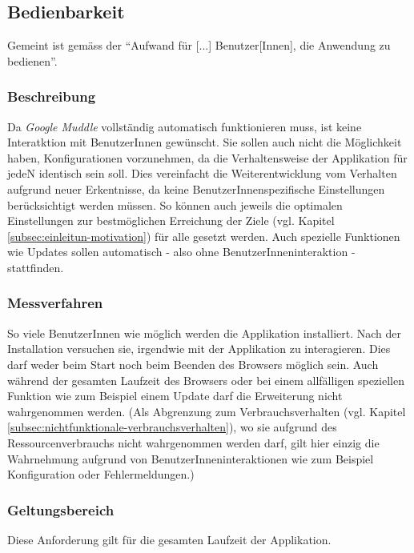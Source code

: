 \subsection{Bedienbarkeit}
\label{subsec:nichtfunktionale-bedienbarkeit}

Gemeint ist gemäss \cite{iso:9126} der \enquote{Aufwand für [...]
Benutzer[Innen], die Anwendung zu bedienen}.

\subsubsection{Beschreibung}

Da \textit{Google Muddle} vollständig automatisch funktionieren muss, ist keine
Interatktion mit BenutzerInnen gewünscht. Sie sollen auch nicht die Möglichkeit
haben, Konfigurationen vorzunehmen, da die Verhaltensweise der Applikation für
jedeN identisch sein soll. Dies vereinfacht die Weiterentwicklung vom Verhalten
aufgrund neuer Erkentnisse, da keine BenutzerInnenspezifische Einstellungen
berücksichtigt werden müssen. So können auch jeweils die optimalen Einstellungen
zur bestmöglichen Erreichung der Ziele (vgl. Kapitel
\ref{subsec:einleitun-motivation}) für alle gesetzt werden. Auch spezielle
Funktionen wie Updates sollen automatisch - also ohne BenutzerInneninteraktion
- stattfinden.

\subsubsection{Messverfahren}

So viele BenutzerInnen wie möglich werden die Applikation installiert. Nach der
Installation versuchen sie, irgendwie mit der Applikation zu interagieren. Dies
darf weder beim Start noch beim Beenden des Browsers möglich sein. Auch während
der gesamten Laufzeit des Browsers oder bei einem allfälligen speziellen
Funktion wie zum Beispiel einem Update darf die Erweiterung nicht wahrgenommen
werden. (Als Abgrenzung zum Verbrauchsverhalten (vgl. Kapitel 
\ref{subsec:nichtfunktionale-verbrauchsverhalten}), wo sie aufgrund des
Ressourcenverbrauchs nicht wahrgenommen werden darf, gilt hier einzig die
Wahrnehmung aufgrund von BenutzerInneninteraktionen wie zum Beispiel
Konfiguration oder Fehlermeldungen.)

\subsubsection{Geltungsbereich}

Diese Anforderung gilt für die gesamten Laufzeit der Applikation.
